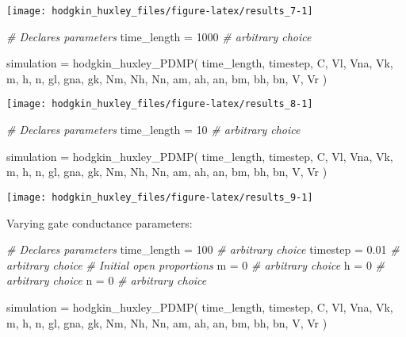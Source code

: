\documentclass[
]{article}
\newenvironment{Shaded}{\begin{snugshade}}{\end{snugshade}}
\newcommand{\CommentTok}[1]{\textcolor[rgb]{0.56,0.35,0.01}{\textit{#1}}}
\newcommand{\DecValTok}[1]{\textcolor[rgb]{0.00,0.00,0.81}{#1}}
\newcommand{\FloatTok}[1]{\textcolor[rgb]{0.00,0.00,0.81}{#1}}
\newcommand{\FunctionTok}[1]{\textcolor[rgb]{0.00,0.00,0.00}{#1}}
\newcommand{\NormalTok}[1]{#1}
\newcommand{\OtherTok}[1]{\textcolor[rgb]{0.56,0.35,0.01}{#1}}
\begin{document}
\texttt{[image: hodgkin\_huxley\_files/figure-latex/results\_7-1]}

\begin{Shaded}
\begin{Highlighting}[]
\CommentTok{\# Declares parameters}
\NormalTok{time\_length }\OtherTok{=} \DecValTok{1000}   \CommentTok{\# arbitrary choice}

\NormalTok{simulation }\OtherTok{=} \FunctionTok{hodgkin\_huxley\_PDMP}\NormalTok{(}
\NormalTok{  time\_length, timestep,}
\NormalTok{  C, }
\NormalTok{  Vl, Vna, Vk, }
\NormalTok{  m, h, n,}
\NormalTok{  gl, gna, gk,}
\NormalTok{  Nm, Nh, Nn,}
\NormalTok{  am, ah, an, bm, bh, bn,}
\NormalTok{  V, Vr}
\NormalTok{)}
\end{Highlighting}
\end{Shaded}

\texttt{[image: hodgkin\_huxley\_files/figure-latex/results\_8-1]}

\begin{Shaded}
\begin{Highlighting}[]
\CommentTok{\# Declares parameters}
\NormalTok{time\_length }\OtherTok{=} \DecValTok{10}   \CommentTok{\# arbitrary choice}

\NormalTok{simulation }\OtherTok{=} \FunctionTok{hodgkin\_huxley\_PDMP}\NormalTok{(}
\NormalTok{  time\_length, timestep,}
\NormalTok{  C, }
\NormalTok{  Vl, Vna, Vk, }
\NormalTok{  m, h, n,}
\NormalTok{  gl, gna, gk,}
\NormalTok{  Nm, Nh, Nn,}
\NormalTok{  am, ah, an, bm, bh, bn,}
\NormalTok{  V, Vr}
\NormalTok{)}
\end{Highlighting}
\end{Shaded}

\texttt{[image: hodgkin\_huxley\_files/figure-latex/results\_9-1]}

Varying gate conductance parameters:

\begin{Shaded}
\begin{Highlighting}[]
\CommentTok{\# Declares parameters}
\NormalTok{time\_length }\OtherTok{=} \DecValTok{100}     \CommentTok{\# arbitrary choice}
\NormalTok{timestep    }\OtherTok{=} \FloatTok{0.01}    \CommentTok{\# arbitrary choice}
\CommentTok{\# Initial open proportions}
\NormalTok{m           }\OtherTok{=} \DecValTok{0}    \CommentTok{\# arbitrary choice}
\NormalTok{h           }\OtherTok{=} \DecValTok{0}    \CommentTok{\# arbitrary choice}
\NormalTok{n           }\OtherTok{=} \DecValTok{0}    \CommentTok{\# arbitrary choice}

\NormalTok{simulation }\OtherTok{=} \FunctionTok{hodgkin\_huxley\_PDMP}\NormalTok{(}
\NormalTok{  time\_length, timestep,}
\NormalTok{  C, }
\NormalTok{  Vl, Vna, Vk, }
\NormalTok{  m, h, n,}
\NormalTok{  gl, gna, gk,}
\NormalTok{  Nm, Nh, Nn,}
\NormalTok{  am, ah, an, bm, bh, bn,}
\NormalTok{  V, Vr}
\NormalTok{)}
\end{Highlighting}
\end{Shaded}
\end{document}
